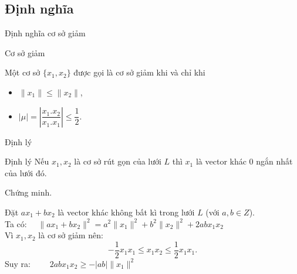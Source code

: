 \documentclass{beamer}
\numberwithin{equation}{section}
\begin{document}
\subsection{Định nghĩa} 
\begin{frame}{Định nghĩa   cơ sở giảm}
    \begin{block}{Cơ sở giảm}

    
    


Một cơ sở $\{x_1, x_2\}$ được gọi là cơ sở giảm khi và chỉ khi
\begin{itemize}
\item $\|x_1\| \leq \|x_2\|$,
\item $|\mu| = \left|\dfrac{x_1.x_2}{x_1.x_1}\right| \leq \dfrac{1}{2}$.
\end{itemize} 
    
    
\end{block}
    \end{frame}
\begin{frame}{Định lý}
\begin{block}{Định lý}
Nếu $x_1, x_2$ là cơ sở rút gọn của lưới $L$ thì $x_1$ là vector khác $0$ ngắn nhất của lưới đó.
\end{block}

Chứng minh.

Đặt $ax_1 + bx_2$ là vector khác không bất kì trong lưới $L$ (với $a, b \in Z$).\\
Ta có: \hspace{4cm}$ \quad \|ax_1 + bx_2\|^2 = a^2\|x_1\|^2 + b^2\|x_2\|^2 + 2abx_1x_2$\\
Vì $x_1, x_2$ là cơ sở giảm nên: $$-\frac{1}{2}x_1x_1 \leq x_1x_2 \leq \frac{1}{2}x_1x_1 \text{.}$$
Suy ra: \hspace{3cm} $\qquad 2abx_1x_2 \geq -|ab|\|x_1\|^2 $

\end{frame}

\end{document}
